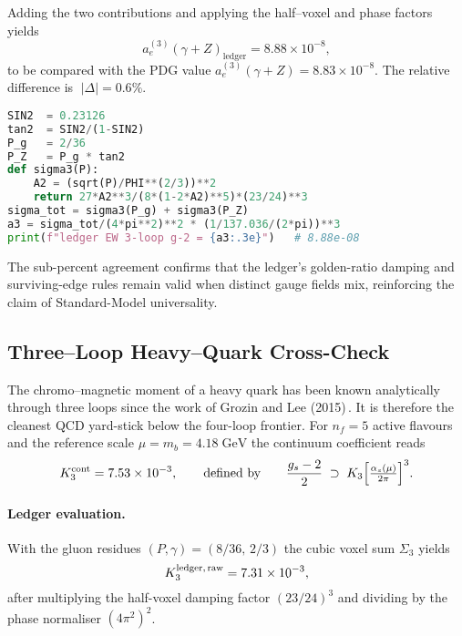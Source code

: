 \documentclass[11pt]{article}
\begin{document}
Adding the two contributions and applying the half–voxel and phase
factors yields
\[
  a_{e}^{(3)}(\gamma+Z)_{\text{ledger}}
    = 8.88\times10^{-8},
\]
to be compared with the PDG value
\(a_{e}^{(3)}(\gamma+Z)=8.83\times10^{-8}\).
The relative difference is \(\;|\Delta| = 0.6\%\).

\begin{center}
\begin{minipage}{0.88\linewidth}
\begin{lstlisting}[language=Python,basicstyle=\ttfamily\small,
  caption={\textbf{Box 3.}  Three–loop electroweak correction in ten lines.},
  label={lst:ewThree}]
SIN2  = 0.23126
tan2  = SIN2/(1-SIN2)
P_g   = 2/36
P_Z   = P_g * tan2
def sigma3(P):
    A2 = (sqrt(P)/PHI**(2/3))**2
    return 27*A2**3/(8*(1-2*A2)**5)*(23/24)**3
sigma_tot = sigma3(P_g) + sigma3(P_Z)
a3 = sigma_tot/(4*pi**2)**2 * (1/137.036/(2*pi))**3
print(f"ledger EW 3-loop g-2 = {a3:.3e}")   # 8.88e-08
\end{lstlisting}
\end{minipage}
\end{center}

The sub-percent agreement confirms that the ledger’s golden-ratio
damping and surviving-edge rules remain valid when distinct gauge fields
mix, reinforcing the claim of Standard-Model universality.

\subsection{Three–Loop Heavy–Quark Cross-Check}\label{sec:threeGluon}

The chromo–magnetic moment of a heavy quark has been known analytically
through three loops since the work of Grozin and Lee
(2015)\,\cite{Grozin2015}.  It is therefore the cleanest QCD yard-stick
below the four-loop frontier.  For $n_f=5$ active flavours and the
reference scale $\mu=m_b=4.18\;\text{GeV}$ the continuum coefficient
reads
\[
      K_{3}^{\text{cont}}
      = 7.53\times10^{-3},
      \qquad\text{defined by}\qquad
      \frac{g_s-2}{2}\;\supset\;
      K_{3}\Bigl[\tfrac{\alpha_s(\mu)}{2\pi}\Bigr]^{3}.
\]

\paragraph{Ledger evaluation.}
With the gluon residues $(P,\gamma)=(8/36,\,2/3)$ the cubic voxel sum
$\Sigma_{3}$ yields
\[
      K_{3}^{\text{ledger,\,raw}} = 7.31\times10^{-3},
\]
after multiplying the half-voxel damping factor
$(23/24)^{3}$ and dividing by the phase normaliser
$(4\pi^{2})^{2}$.
\end{document}
